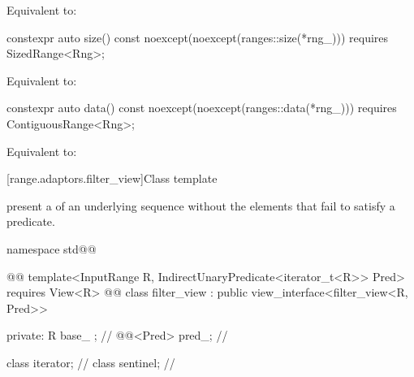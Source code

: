 {{\begin{itemdescr}
\pnum
\effects Equivalent to: 
\end{itemdescr}

%
\begin{itemdecl}
constexpr auto size() const
  noexcept(noexcept(ranges::size(*rng_)))
  requires SizedRange<Rng>;
\end{itemdecl}

\begin{itemdescr}
\pnum
\effects Equivalent to: 
\end{itemdescr}

%
\begin{itemdecl}
constexpr auto data() const
  noexcept(noexcept(ranges::data(*rng_)))
  requires ContiguousRange<Rng>;
\end{itemdecl}

\begin{itemdescr}
\pnum
\effects Equivalent to: 
\end{itemdescr}
} %

[range.adaptors.filter_view]{Class template }

\pnum
{}   present a
 of an underlying sequence without the
elements that fail to satisfy a predicate.

\pnum
\begin{example}
\end{example}

\begin{codeblock}
namespace std@@ { @@
  template<InputRange R, IndirectUnaryPredicate<iterator_t<R>> Pred>
    requires View<R> @@
  class filter_view : public view_interface<filter_view<R, Pred>> {
  private:
    R base_ {};                              // \expos
    @@<Pred> pred_;                 // \expos

    class iterator;                          // \expos
    class sentinel;                          // \expos

}}
\end{codeblock}}
